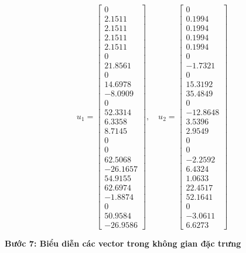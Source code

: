 \[
u_1 = \begin{bmatrix}
0 \\
2.1511 \\
2.1511 \\
2.1511 \\
2.1511 \\
0 \\
21.8561 \\
0 \\
14.6978 \\
-8.0909 \\
0 \\
52.3314 \\
6.3358 \\
8.7145 \\
0 \\
0 \\
62.5068 \\
-26.1657 \\
54.9155 \\
62.6974 \\
-1.8874 \\
0 \\
50.9584 \\
-26.9586
\end{bmatrix}, \quad
u_2 = \begin{bmatrix}
0 \\
0.1994 \\
0.1994 \\
0.1994 \\
0.1994 \\
0 \\
-1.7321 \\
0 \\
15.3192 \\
35.4849 \\
0 \\
-12.8648 \\
3.5396 \\
2.9549 \\
0 \\
0 \\
-2.2592 \\
6.4324 \\
1.0633 \\
22.4517 \\
52.1641 \\
0 \\
-3.0611 \\
6.6273
\end{bmatrix}
\]

\textbf{Bước 7: Biểu diễn các vector trong không gian đặc trưng}

